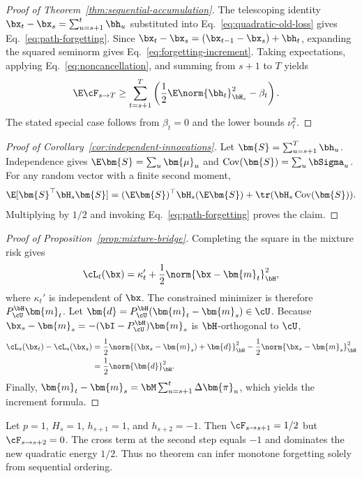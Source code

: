 \begin{proof}[Proof of Theorem~\ref{thm:sequential-accumulation}]
The telescoping identity
$\bx_t-\bx_s=\sum_{u=s+1}^{t}\bh_u$ substituted into
Eq.~\eqref{eq:quadratic-old-loss} gives
Eq.~\eqref{eq:path-forgetting}. Since
$\bx_t-\bx_s=(\bx_{t-1}-\bx_s)+\bh_t$, expanding the squared seminorm gives
Eq.~\eqref{eq:forgetting-increment}. Taking expectations, applying
Eq.~\eqref{eq:noncancellation}, and summing from $s+1$ to $T$ yields
\begin{align}
\E\cF_{s\to T}
&\geq\sum_{t=s+1}^{T}
\left(\frac12\E\norm{\bh_t}_{\bH_s}^2-\beta_t\right).
\end{align}
The stated special case follows from $\beta_t=0$ and the lower bounds
$\nu_t^2$.
\end{proof}

\begin{proof}[Proof of Corollary~\ref{cor:independent-innovations}]
Let $\bm{S}=\sum_{u=s+1}^{T}\bh_u$. Independence gives
$\E\bm{S}=\sum_u\bm{\mu}_u$ and
$\operatorname{Cov}(\bm{S})=\sum_u\bSigma_u$. For any random vector with a
finite second moment,
\begin{equation}
\E[\bm{S}^\top\bH_s\bm{S}]
=(\E\bm{S})^\top\bH_s(\E\bm{S})
+\tr(\bH_s\operatorname{Cov}(\bm{S})).
\end{equation}
Multiplying by $1/2$ and invoking Eq.~\eqref{eq:path-forgetting} proves the
claim.
\end{proof}

\begin{proof}[Proof of Proposition~\ref{prop:mixture-bridge}]
Completing the square in the mixture risk gives
\begin{equation}
\cL_t(\bx)=\kappa_t'
+\frac12\norm{\bx-\bm{m}_t}_{\bH}^2,
\end{equation}
where $\kappa_t'$ is independent of $\bx$. The constrained minimizer is therefore
$P_{\cU}^{\bH}\bm{m}_t$. Let
$\bm{d}=P_{\cU}^{\bH}(\bm{m}_t-\bm{m}_s)\in\cU$. Because
$\bx_s-\bm{m}_s=-(\bI-P_{\cU}^{\bH})\bm{m}_s$ is $\bH$-orthogonal to
$\cU$,
\begin{align}
\cL_s(\bx_t)-\cL_s(\bx_s)
&=\frac12\norm{(\bx_s-\bm{m}_s)+\bm{d}}_{\bH}^2
-\frac12\norm{\bx_s-\bm{m}_s}_{\bH}^2\\
&=\frac12\norm{\bm{d}}_{\bH}^2.
\end{align}
Finally,
$\bm{m}_t-\bm{m}_s=\bM\sum_{u=s+1}^{t}\Delta\bm{\pi}_u$, which yields the
increment formula.
\end{proof}

\begin{remark}
Let $p=1$, $H_s=1$, $h_{s+1}=1$, and $h_{s+2}=-1$. Then
$\cF_{s\to s+1}=1/2$ but $\cF_{s\to s+2}=0$. The cross term at the second
step equals $-1$ and dominates the new quadratic energy $1/2$. Thus no theorem
can infer monotone forgetting solely from sequential ordering.
\end{remark}

